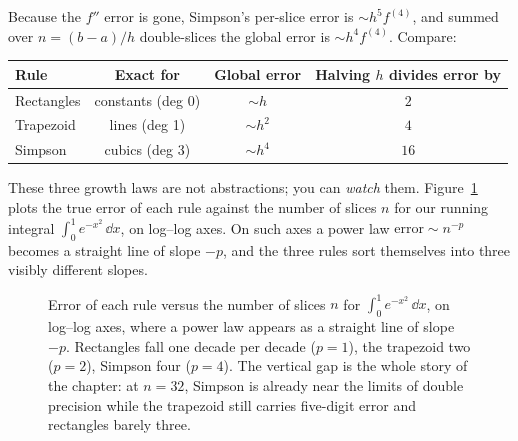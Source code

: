 Because the $f''$ error is gone, Simpson's per-slice error is $\sim h^5 f^{(4)}$, and summed over $n = (b-a)/h$ double-slices the global error is $\sim h^4 f^{(4)}$. Compare:

\begin{center}
\renewcommand{\arraystretch}{1.3}
\begin{tabular}{lccc}
\toprule
Rule & Exact for & Global error & Halving $h$ divides error by\\
\midrule
Rectangles & constants (deg 0) & $\sim h$ & $2$\\
Trapezoid  & lines (deg 1)     & $\sim h^2$ & $4$\\
Simpson    & cubics (deg 3)    & $\sim h^4$ & $16$\\
\bottomrule
\end{tabular}
\end{center}

These three growth laws are not abstractions; you can \emph{watch} them. Figure~\ref{ch27:fig-conv} plots the true error of each rule against the number of slices $n$ for our running integral $\int_0^1 e^{-x^2}\,\dd x$, on log--log axes. On such axes a power law $\text{error} \sim n^{-p}$ becomes a straight line of slope $-p$, and the three rules sort themselves into three visibly different slopes.

\begin{figure}[H]
\centering
{}
\caption{Error of each rule versus the number of slices $n$ for $\int_0^1 e^{-x^2}\,\dd x$, on log--log axes, where a power law appears as a straight line of slope $-p$. Rectangles fall one decade per decade ($p=1$), the trapezoid two ($p=2$), Simpson four ($p=4$). The vertical gap is the whole story of the chapter: at $n=32$, Simpson is already near the limits of double precision while the trapezoid still carries five-digit error and rectangles barely three.}
\label{ch27:fig-conv}
\end{figure}

